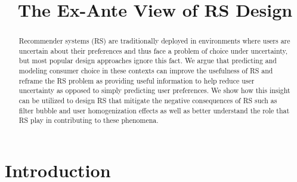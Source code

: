 \documentclass[sigconf]{acmart}
\begin{document}
%
\title{The Ex-Ante View of RS Design}
%

%
\begin{abstract}
Recommender systems (RS) are traditionally deployed in environments where users are uncertain about their preferences and thus face a problem of choice under uncertainty, but most popular design approaches ignore this fact. We argue that predicting and modeling consumer choice in these contexts can improve the usefulness of RS and reframe the RS problem as providing useful information to help reduce user uncertainty as opposed to simply predicting user preferences. We show how this insight can be utilized to design RS that mitigate the negative consequences of RS such as filter bubble and user homogenization effects as well as better understand the role that RS play in contributing to these phenomena.
\end{abstract}

%
%

%

%
\maketitle

\section{Introduction}
\end{document}
